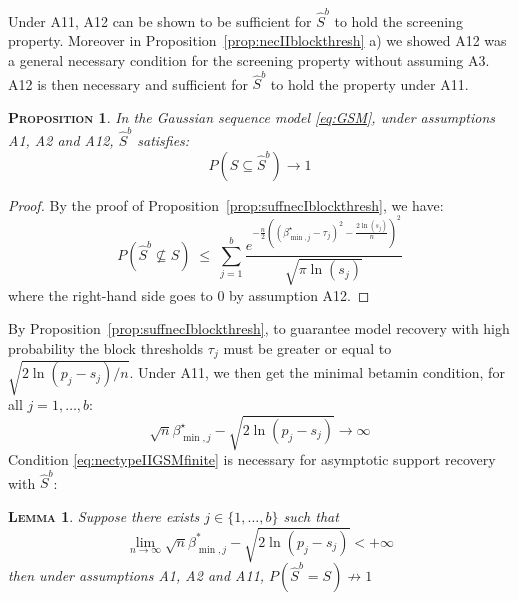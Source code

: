 \documentclass[aos]{imsart}
\theoremstyle{plain}
\newtheorem{prop}[thm]{\textsc{Proposition}}
\newtheorem{lem}[thm]{\textsc{Lemma}}
\begin{document}
Under A11, A12 can be shown to be sufficient for $\hat{S}^{b}$ to hold the screening property. Moreover in Proposition~\ref{prop:necIIblockthresh} a) we showed A12 was a general necessary condition for the screening property without assuming A3. A12 is then necessary and sufficient for $\hat{S}^{b}$ to hold the property under A11.
\begin{prop}\label{prop:suffnecIIblockthreshbis}
 In the Gaussian sequence model \eqref{eq:GSM}, under assumptions A1, A2 and A12, $\hat{S}^{b}$ satisfies:
$$P(S\subseteq \hat{S}^{b} ) \to 1$$
\end{prop}
\begin{proof}
    By the proof of Proposition~\ref{prop:suffnecIblockthresh}, we have: \begin{equation*}
P\left(\hat{S}^{b} \not\subseteq S\right)\;\leq\; \sum_{j=1}^b\frac{e^{-\tfrac{n}{2}\left((\beta^\star_{\min,j}-\tau_j)^2-\tfrac{2\ln(s_j)}{n}\right)^2}}{\sqrt{\pi\ln(s_j)}}
 \end{equation*}
 where the right-hand side goes to 0 by assumption A12.
\end{proof}
By Proposition~\ref{prop:suffnecIblockthresh}, to guarantee model recovery with high probability the block thresholds $\tau_j$ must be greater or equal to $\sqrt{2\ln(p_j-s_j)/n}$. Under A11, we then get the minimal betamin condition, for all $j=1,\ldots,b$:
\begin{equation}\label{eq:nectypeIIGSMfinite}
    \sqrt{n}\beta_{\min,j}^{\star}-\sqrt{2\ln(p_j-s_j)} \to \infty
\end{equation}
Condition \eqref{eq:nectypeIIGSMfinite} is necessary for asymptotic support recovery with $\hat{S}^{b}$:
\begin{lem}\label{lem:necbetaminblockthresh2}
    Suppose there exists $j\in\{1,\ldots,b\}$ such that
    \begin{equation}\label{eq:necbetaminblockthreshbis}
      \lim_{n\to \infty}\sqrt{n}\beta_{\min,j}^*-\sqrt{2\ln(p_j-s_j)} < +\infty  
    \end{equation}
then under assumptions A1, A2 and A11,\;  $P(\hat{S}^{b} = S)\not \to 1$
\end{lem}
\end{document}
